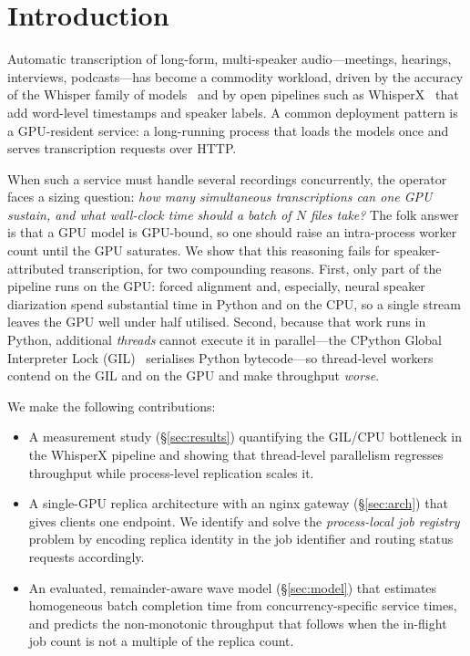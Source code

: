 \documentclass[10pt]{article}
\begin{document}
\section{Introduction}
\label{sec:intro}

Automatic transcription of long-form, multi-speaker audio---meetings, hearings,
interviews, podcasts---has become a commodity workload, driven by the accuracy
of the Whisper family of models~\cite{radford2023whisper} and by open pipelines
such as WhisperX~\cite{bain2023whisperx} that add word-level timestamps and
speaker labels. A common deployment pattern is a GPU-resident service: a
long-running process that loads the models once and serves transcription
requests over HTTP.

When such a service must handle several recordings concurrently, the operator
faces a sizing question: \emph{how many simultaneous transcriptions can one GPU
sustain, and what wall-clock time should a batch of $N$ files take?} The folk
answer is that a GPU model is GPU-bound, so one should raise an intra-process
worker count until the GPU saturates. We show that this reasoning fails for
speaker-attributed transcription, for two compounding reasons. First, only part
of the pipeline runs on the GPU: forced alignment and, especially, neural
speaker diarization spend substantial time in Python and on the CPU, so a single
stream leaves the GPU well under half utilised. Second, because that work runs
in Python, additional \emph{threads} cannot execute it in parallel---the CPython
Global Interpreter Lock (GIL)~\cite{cpythongil} serialises Python bytecode---so
thread-level workers contend on the GIL and on the GPU and make throughput
\emph{worse}.

We make the following contributions:
\begin{itemize}
  \item A measurement study (\S\ref{sec:results}) quantifying the GIL/CPU
  bottleneck in the WhisperX pipeline and showing that thread-level parallelism
  regresses throughput while process-level replication scales it.
  \item A single-GPU replica architecture with an nginx gateway
  (\S\ref{sec:arch}) that gives clients one endpoint. We identify and solve the
  \emph{process-local job registry} problem by encoding replica identity in the
  job identifier and routing status requests accordingly.
  \item An evaluated, remainder-aware wave model (\S\ref{sec:model}) that
  estimates homogeneous batch completion time from concurrency-specific
  service times, and predicts the non-monotonic throughput that follows when
  the in-flight job count is not a multiple of the replica count.
\end{itemize}
\end{document}
